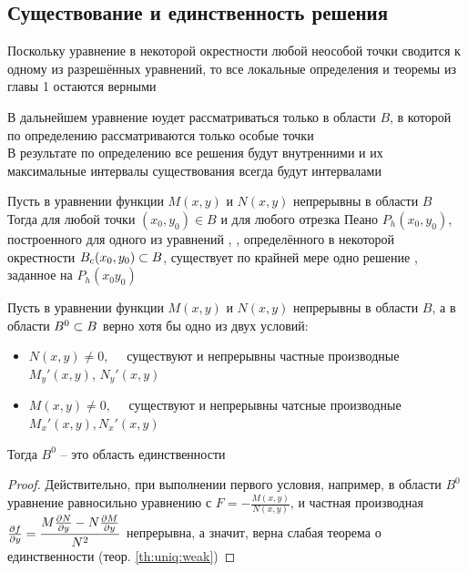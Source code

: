 \subsection{Существование и единственность решения}

Поскольку уравнение  в некоторой окрестности любой неособой точки сводится к одному из разрешённых уравнений, то все локальные определения и теоремы из главы 1 остаются верными

\begin{remark}
    В дальнейшем уравнение  юудет рассматриваться только в области $ B $, в которой по определению рассматриваются только особые точки \\
    В результате по определению все решения будут внутренними и их максимальные интервалы существования всегда будут интервалами
\end{remark}

\begin{theorem}
    Пусть в уравнении  функции $ M(x, y) $ и $ N(x, y) $ непрерывны в области $ B $ \\
    Тогда для любой точки $ (x_0, y_0) \in B $ и для любого отрезка Пеано $ P_h(x_0, y_0) $, построенного для одного из уравнений , , определённого в некоторой окрестности $ B_c(x_0, y_0) \subset B $, существует по крайней мере одно решение , заданное на $ P_h(x_0 y_0) $
\end{theorem}

\begin{theorem}
    Пусть в уравнении  функции $ M(x, y) $ и $ N(x, y) $ непрерывны в области $ B $, а в области $ B^0 \subset B $ верно хотя бы одно из двух условий:
    \begin{itemize}
    	\item $ N(x, y) \ne 0, \quad $ существуют и непрерывны частные производные $ M_y'(x, y) $, $ N_y'(x, y) $
        \item $ M(x, y) \ne 0, \quad $ существуют и непрерывны чатсные производные $ M_x'(x, y), N_x'(x, y) $
    \end{itemize}
    Тогда $ B^0 $ -- это область единственности
\end{theorem}

\begin{proof}
    Действительно, при выполнении первого условия, например, в области $ B^0 $ уравнение  равносильно уравнению  с $ F = -\frac{M(x, y)}{N(x, y)} $, и частная производная $ \frac{\partial {f}}{\partial {y}} = \dfrac{M \frac{\partial {N}}{\partial {y}} - N \frac{\partial {M}}{\partial {y}}}{N^2} $ непрерывна, а значит, верна слабая теорема о единственности (теор. \ref{th:uniq:weak})
\end{proof}

